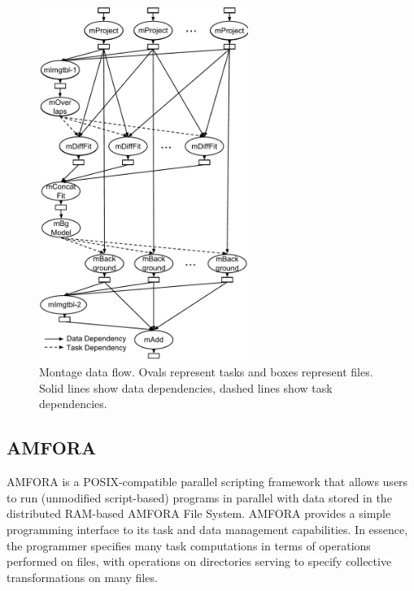 \documentclass{sig-alternate}
\begin{document}
\begin{figure}[h]
\begin{center}
    \includegraphics[width=68mm]{pictures/montage}
\caption {Montage data flow. Ovals represent tasks and boxes represent files. Solid lines show data dependencies, dashed lines show task dependencies.
    \label{fig:montage-flow}
}
\end{center}
\end{figure}



\subsection{AMFORA}

AMFORA is a POSIX-compatible parallel scripting framework that allows users to run (unmodified script-based) 
programs in parallel with data stored in the distributed RAM-based AMFORA File System.  
AMFORA provides a simple programming interface to its task and data management capabilities.
In essence, the programmer specifies many task computations in terms of operations performed on files,
with operations on directories serving to specify collective transformations on many files.
\end{document}
